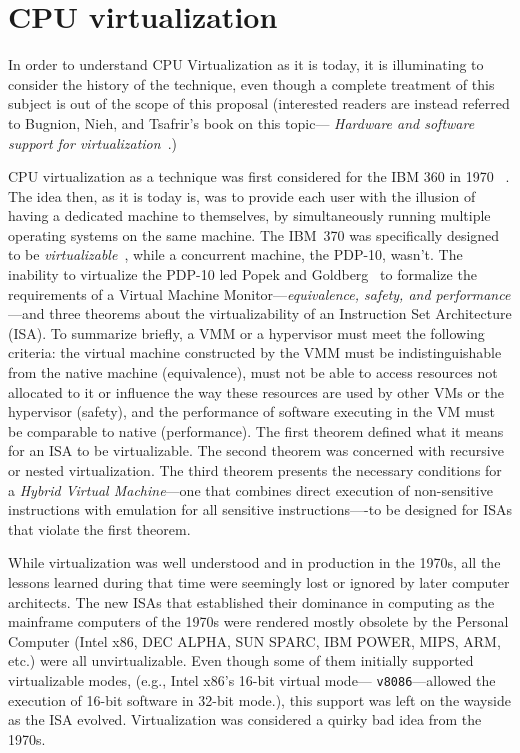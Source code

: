 \section{CPU virtualization}
\label{sec:cpuvirt}
In order to understand CPU Virtualization as it is today, it is illuminating
to consider the history of the technique, even though a complete treatment of
this subject is out of the scope of this proposal (interested readers are
instead referred to Bugnion, Nieh, and Tsafrir's book on this topic---\emph{
Hardware and software support for virtualization}~\cite{bugnion-nieh-tsafrir}.)

CPU virtualization as a technique was first considered for the IBM 360 in 1970~
\cite{meyer-virtual-machines}. The idea then, as it is today is, was to provide
each user with the illusion of having a dedicated machine to themselves, by
simultaneously running multiple operating systems on the same machine.
The IBM~370 was specifically designed to be \emph{virtualizable}~\cite{vm370},
while a concurrent machine, the PDP-10, wasn't. The inability to virtualize
the PDP-10 led Popek and Goldberg~\cite{popek-goldberg} to formalize the
requirements of a Virtual Machine Monitor---\emph{equivalence, safety, and
performance}---and three theorems about the virtualizability of an Instruction
Set Architecture (ISA). To summarize briefly, a VMM or a hypervisor must meet
the following criteria:
the virtual machine constructed by the VMM must be indistinguishable from the
native machine (equivalence), must not be able to access resources not
allocated to it or influence the way these resources are used by other VMs or
the hypervisor (safety), and the performance of software executing in the VM
must be comparable to native (performance).
The first theorem defined what it means for an ISA to be virtualizable.
The second theorem was concerned with recursive or nested virtualization.
The third theorem presents the necessary conditions for a \emph{Hybrid Virtual
Machine}---one that combines direct execution of non-sensitive instructions
with emulation for all sensitive instructions----to be designed for ISAs that
violate the first theorem.

While virtualization was well understood and in production in the 1970s, all
the lessons learned during that time were seemingly lost or ignored by later
computer architects. The new ISAs that established their dominance in
computing as the mainframe computers of the 1970s were rendered mostly
obsolete by the Personal Computer (Intel x86, DEC ALPHA, SUN SPARC, IBM POWER,
MIPS, ARM, etc.) were all unvirtualizable. Even though some of them initially
supported virtualizable modes, (e.g., Intel x86's 16-bit virtual mode---
\texttt{v8086}---allowed the execution of 16-bit software in 32-bit mode.),
this support was left on the wayside as the ISA evolved. Virtualization was
considered a quirky bad idea from the 1970s.

